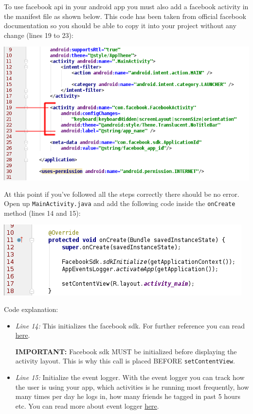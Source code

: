 To use facebook api in your android app you must also add a facebook activity in the manifest file as shown below. This code has been taken from official facebook documentation so you should be able to copy it into your project without any change (lines 19 to 23):

\begin{center}
	\includegraphics[scale=\SourceCodeScale]{chapters/ch12/images/15}
\end{center}

At this point if you've followed all the steps correctly there should be no error. Open up \texttt{MainActivity.java} and add the following code inside the \texttt{onCreate} method (lines 14 and 15):

\begin{center}
	\includegraphics[scale=\SourceCodeScale]{chapters/ch12/images/16}
\end{center}

Code explanation:
\begin{itemize}
	\item \textit{Line 14:} This initializes the facebook sdk. For further reference you can read \href{https://developers.facebook.com/docs/reference/android/current/class/FacebookSdk/}{here}.
	
	\textbf{IMPORTANT:} Facebook sdk MUST be initialized before displaying the activity layout. This is why this call is placed BEFORE \texttt{setContentView}.
	
	\item \textit{Line 15:} Initialize the event logger. With the event logger you can track how the user is using your app, which activities is he running most frequently, how many times per day he logs in, how many friends he tagged in past 5 hours etc. You can read more about event logger \href{https://developers.facebook.com/docs/reference/android/current/class/AppEventsLogger/}{here}.
\end{itemize}

